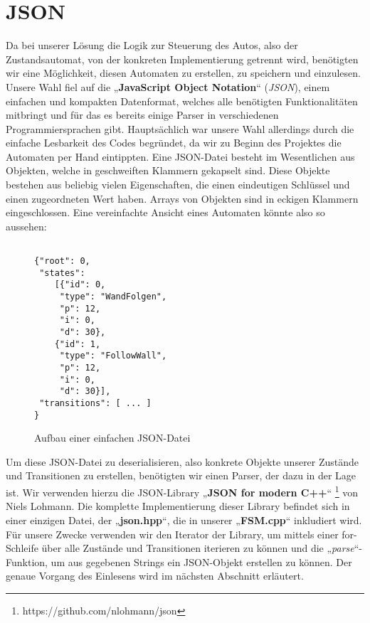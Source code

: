 

\section{JSON}
\label{sec:json}
Da bei unserer Lösung die Logik zur Steuerung des Autos, also der
Zustandsautomat, von der konkreten Implementierung getrennt wird, benötigten
wir eine Möglichkeit, diesen Automaten zu erstellen, zu speichern und einzulesen.
Unsere Wahl fiel auf die „\textbf{JavaScript Object Notation}“ (\textit{JSON}), einem
einfachen und kompakten Datenformat, welches alle benötigten Funktionalitäten
mitbringt und für das es bereits einige Parser in verschiedenen
Programmiersprachen gibt. Hauptsächlich war unsere Wahl allerdings durch die
einfache Lesbarkeit des Codes begründet, da wir zu Beginn des Projektes die
Automaten per Hand eintippten.
Eine JSON-Datei besteht im Wesentlichen aus Objekten, welche in geschweiften
Klammern gekapselt sind. Diese Objekte bestehen aus beliebig vielen
Eigenschaften, die einen eindeutigen Schlüssel und einen zugeordneten Wert
haben. Arrays von Objekten sind in eckigen Klammern eingeschlossen. Eine
vereinfachte Ansicht eines Automaten könnte also so aussehen:

\begin{figure}[thp]
\begin{lstlisting}[style=json]

{"root": 0,
 "states":
    [{"id": 0,
     "type": "WandFolgen",
     "p": 12,
     "i": 0,
     "d": 30},       
    {"id": 1,
     "type": "FollowWall",
     "p": 12,
     "i": 0,
     "d": 30}],
 "transitions": [ ... ]
}

\end{lstlisting}
\centering
\caption{Aufbau einer einfachen JSON-Datei}
\end{figure}

Um diese JSON-Datei zu deserialisieren, also konkrete Objekte unserer Zustände
und Transitionen zu erstellen, benötigten wir einen Parser, der dazu in der Lage
ist. Wir verwenden hierzu die JSON-Library „\textbf{JSON for modern C++}“ \footnote[1]{https://github.com/nlohmann/json} von Niels
Lohmann.
Die komplette Implementierung dieser Library befindet sich in einer einzigen
Datei, der „\textbf{json.hpp}“, die in unserer „\textbf{FSM.cpp}“ inkludiert wird.
Für unsere Zwecke verwenden wir den Iterator der Library, um mittels einer
for-Schleife über alle Zustände und Transitionen iterieren zu können und die
„\textit{parse}“-Funktion, um aus gegebenen Strings ein JSON-Objekt erstellen zu können.
Der genaue Vorgang des Einlesens wird im nächsten Abschnitt erläutert.